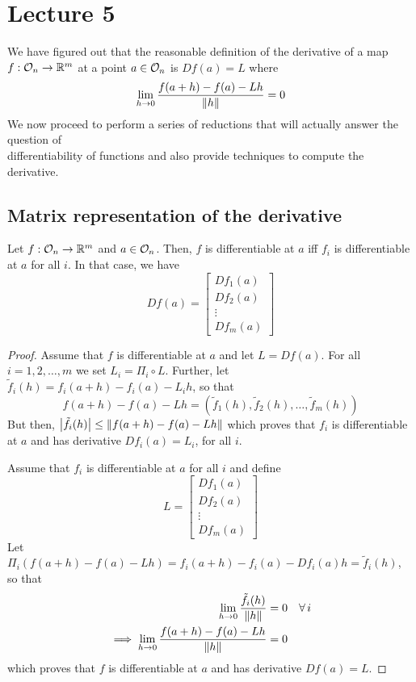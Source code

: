 \documentclass[../Analysis-3.tex]{subfiles}
\begin{document}
\chapter*{Lecture 5} %
\setcounter{chapter}{5} %
\setcounter{section}{0}

We have figured out that the reasonable definition of the derivative of a map $ f: \mathcal{O}_{n} \to \mathbb{R}^m $ at a point $ a \in \mathcal{O}_{n} $ is $ Df(a) = L $ where
\[ \lim_{h \to 0}  \frac{f(a+h)-f(a)-Lh}{\norm{h}} = 0 \]
We now proceed to perform a series of reductions that will actually answer the question of \\ 
differentiability of functions and also provide techniques to compute the derivative.

\section{Matrix representation of the derivative}

\begin{Thm}{}{}
  Let $ f: \mathcal{O}_{n} \to \mathbb{R}^m $ and $ a \in \mathcal{O}_{n} $. Then, $ f $ is differentiable at $ a $ iff $ f_i $ is differentiable at $ a $ for all $ i $. In that case, we have
  \[ Df(a) =
    \begin{bmatrix}
      Df_1(a) \\
      Df_2(a) \\
      \vdots  \\
      Df_m(a)
    \end{bmatrix} \]
\end{Thm}

\begin{proof}
  Assume that $ f $ is differentiable at $ a $ and let $ L = Df(a) $. For all $ i = 1,2,\dots,m $ we set $ L_i = \Pi_i \circ L $. Further, let $ \tilde{f}_i(h) = f_i(a+h)-f_i(a)-L_ih $, so that
  \[ f(a+h)-f(a)-Lh = (\tilde{f}_1(h), \tilde{f}_2(h), \dots, \tilde{f}_m(h)) \]
  But then, $ \abs{\tilde{f}_i(h)} \leq \norm{f(a+h)-f(a)-Lh} $ which proves that $ f_i $ is differentiable at $ a $ and has derivative $ Df_i(a) = L_i $, for all $ i $.
  \msk
  
  Assume that $ f_i $ is differentiable at $ a $ for all $ i $ and define
  \[ L =
    \begin{bmatrix}
      Df_1(a) \\
      Df_2(a) \\
      \vdots  \\
      Df_m(a)
    \end{bmatrix} \]
  Let $ \Pi_i(f(a+h)-f(a)-Lh) = f_i(a+h)-f_i(a)-Df_i(a)h =  \tilde{f}_i(h) $, so that
  \begin{align*}
    \lim_{h \to 0} \frac{\tilde{f}_i(h)}{\norm{h}}          & = 0 \quad \forall \, i \\
    \implies \lim_{h \to 0} \frac{f(a+h)-f(a)-Lh}{\norm{h}} & = 0
  \end{align*}
  which proves that $ f $ is differentiable at $ a $ and has derivative $ Df(a) = L $.
\end{proof}
\end{document}
